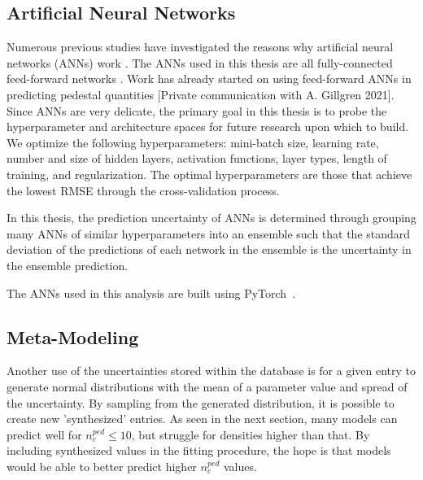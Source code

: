 \documentclass[a4paper, twoside, final, 12pt]{article}
\begin{document}
\subsection{Artificial Neural Networks}

Numerous previous studies have investigated the reasons why artificial neural networks (ANNs) work \cite{silver_mastering_2016, 7333916, CALTECH}.  The ANNs used in this thesis are all fully-connected feed-forward networks \cite{Goodfellow-et-al-2016, SCHMIDHUBER201585}. Work has already started on using feed-forward ANNs in predicting pedestal quantities [Private communication with A. Gillgren 2021]. 
Since ANNs are very delicate, the primary goal in this thesis is to probe the hyperparameter and architecture spaces for future research upon which to build. We optimize the following hyperparameters: mini-batch size, learning rate, number and size of hidden layers, activation functions, layer types, length of training, and regularization. The optimal hyperparameters are those that achieve the lowest RMSE through the cross-validation process.

In this thesis, the prediction uncertainty of ANNs is determined through grouping many ANNs of similar hyperparameters into an ensemble such that the standard deviation of the predictions of each network in the ensemble is the uncertainty in the ensemble prediction.

The ANNs used in this analysis are built using PyTorch~\cite{NEURIPS2019_9015}. 


\subsection{Meta-Modeling}
Another use of the uncertainties stored within the database is for a given entry to generate normal distributions with the mean of a parameter value and spread of the uncertainty. By sampling from the generated distribution, it is possible to create new 'synthesized' entries.
As seen in the next section, many models can predict well for $n_e^{ped} \leq 10$, but struggle for densities higher than that.
By including synthesized values in the fitting procedure, the hope is that models would be able to better predict higher $n_e^{ped}$ values.
\vspace{2cm}
\end{document}
